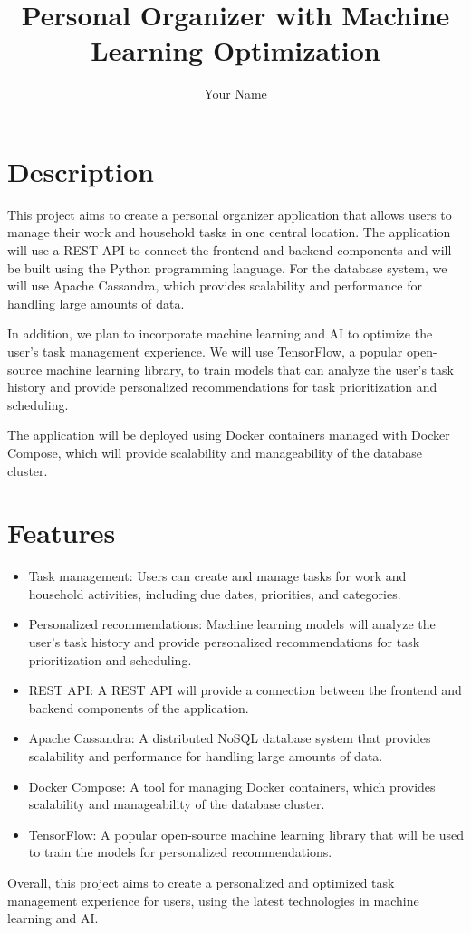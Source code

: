 \documentclass{article}
\begin{document}
\title{Personal Organizer with Machine Learning Optimization}
\author{Your Name}

\maketitle

\section{Description}

This project aims to create a personal organizer application that allows users to manage their work and household tasks in one central location. The application will use a REST API to connect the frontend and backend components and will be built using the Python programming language. For the database system, we will use Apache Cassandra, which provides scalability and performance for handling large amounts of data.

In addition, we plan to incorporate machine learning and AI to optimize the user's task management experience. We will use TensorFlow, a popular open-source machine learning library, to train models that can analyze the user's task history and provide personalized recommendations for task prioritization and scheduling.

The application will be deployed using Docker containers managed with Docker Compose, which will provide scalability and manageability of the database cluster.

\section{Features}

\begin{itemize}
  \item Task management: Users can create and manage tasks for work and household activities, including due dates, priorities, and categories.
  
  \item Personalized recommendations: Machine learning models will analyze the user's task history and provide personalized recommendations for task prioritization and scheduling.
  
  \item REST API: A REST API will provide a connection between the frontend and backend components of the application.
  
  \item Apache Cassandra: A distributed NoSQL database system that provides scalability and performance for handling large amounts of data.
  
  \item Docker Compose: A tool for managing Docker containers, which provides scalability and manageability of the database cluster.
  
  \item TensorFlow: A popular open-source machine learning library that will be used to train the models for personalized recommendations.
\end{itemize}

Overall, this project aims to create a personalized and optimized task management experience for users, using the latest technologies in machine learning and AI.
\end{document}
